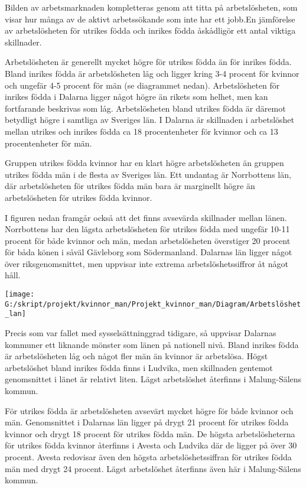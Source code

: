 \documentclass[
]{article}
\begin{document}
Bilden av arbetsmarknaden kompletteras genom att titta på
arbetslösheten, som visar hur många av de aktivt arbetssökande som inte
har ett jobb.En jämförelse av arbetslösheten för utrikes födda och
inrikes födda åskådligör ett antal viktiga skillnader.

Arbetslösheten är generellt mycket högre för utrikes födda än för
inrikes födda. Bland inrikes födda är arbetslösheten låg och ligger
kring 3-4 procent för kvinnor och ungefär 4-5 procent för män (se
diagrammet nedan). Arbetslösheten för inrikes födda i Dalarna ligger
något högre än rikets som helhet, men kan fortfarande beskrivas som låg.
Arbetslösheten bland utrikes födda är däremot betydligt högre i samtliga
av Sveriges län. I Dalarna är skillnaden i arbetslöshet mellan utrikes
och inrikes födda ca 18 procentenheter för kvinnor och ca 13
procentenheter för män.

Gruppen utrikes födda kvinnor har en klart högre arbetslösheten än
gruppen utrikes födda män i de flesta av Sveriges län. Ett undantag är
Norrbottens län, där arbetslösheten för utrikes födda män bara är
marginellt högre än arbetslösheten för utrikes födda kvinnor.

I figuren nedan framgår också att det finns avsevärda skillnader mellan
länen. Norrbottens har den lägsta arbetslösheten för utrikes födda med
ungefär 10-11 procent för både kvinnor och män, medan arbetslösheten
överstiger 20 procent för båda könen i såväl Gävleborg som Södermanland.
Dalarnas län ligger något över riksgenomsnittet, men uppvisar inte
extrema arbetslöshetssiffror åt något håll.

\begin{center}\texttt{[image: G:/skript/projekt/kvinnor\_man/Projekt\_kvinnor\_man/Diagram/Arbetslöshet\_lan]} \end{center}

Precis som var fallet med sysselsättninggrad tidigare, så uppvisar
Dalarnas kommuner ett liknande mönster som länen på nationell nivå.
Bland inrikes födda är arbetslösheten låg och något fler män än kvinnor
är arbetslösa. Högst arbetslöshet bland inrikes födda finns i Ludvika,
men skillnaden gentemot genomsnittet i länet är relativt liten. Lägst
arbetslöshet återfinns i Malung-Sälens kommun.

För utrikes födda är arbetslösheten avsevärt mycket högre för både
kvinnor och män. Genomsnittet i Dalarnas län ligger på drygt 21 procent
för utrikes födda kvinnor och drygt 18 procent för utrikes födda män. De
högsta arbetslösheterna för utrikes födda kvinnor återfinns i Avesta och
Ludvika där de ligger på över 30 procent. Avesta redovisar även den
högsta arbetslöshetssiffran för utrikes födda män med drygt 24 procent.
Lägst arbetslöshet återfinns även här i Malung-Sälens kommun.
\end{document}
